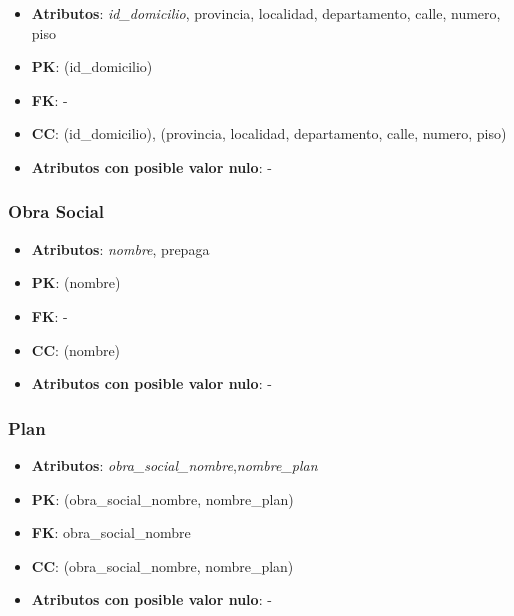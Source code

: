 \documentclass[a4paper,11pt]{article}
\begin{document}
\begin{itemize}

\item 
\textbf{Atributos}: \emph{id\_domicilio}, provincia, localidad, departamento, calle, numero, piso

\item 
\textbf{PK}: (id\_domicilio)

\item
\textbf{FK}: -

\item 
\textbf{CC}: (id\_domicilio),  (provincia, localidad, departamento, calle, numero, piso)

\item 
\textbf{Atributos con posible valor nulo}: -
\end{itemize}

\subsubsection{\textbf{Obra Social}}

\begin{itemize}

\item 
\textbf{Atributos}: \emph{nombre}, prepaga

\item 
\textbf{PK}: (nombre)

\item
\textbf{FK}: -

\item 
\textbf{CC}: (nombre)

\item 
\textbf{Atributos con posible valor nulo}: -

\end{itemize}

\subsubsection{\textbf{Plan}}

\begin{itemize}

\item 
\textbf{Atributos}: \emph{obra\_social\_nombre},\emph{nombre\_plan}

\item 
\textbf{PK}: (obra\_social\_nombre, nombre\_plan)

\item
\textbf{FK}: obra\_social\_nombre

\item 
\textbf{CC}: (obra\_social\_nombre, nombre\_plan)

\item 
\textbf{Atributos con posible valor nulo}: -

\end{itemize}
\end{document}
